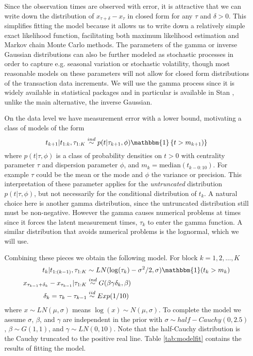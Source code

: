\documentclass{article}
\begin{document}
Since the observation times are observed with error, it is attractive that we can write down the distribution of $x_{\tau + \delta} - x_\tau$ in closed form for any $\tau$ and $\delta>0$. This simplifies fitting the model because it allows us to write down a relatively simple exact likelihood function, facilitating both maximum likelihood estimation and Markov chain Monte Carlo methods. The parameters of the gamma or inverse Gaussian distributions can also be further modeled as stochastic processes in order to capture e.g. seasonal variation or stochastic volatility, though most reasonable models on these parameters will not allow for closed form distributions of the transaction data increments. We will use the gamma process since it is widely available in statistical packages and in particular is available in Stan \citep{stan-software:2015}, unlike the main alternative, the inverse Gaussian.

On the data level we have measurement error with a lower bound, motivating a class of models of the form 
\[
t_{k+1} |t_{1:k}, \tau_{1:K} \stackrel{ind}{\sim} p(t|\tau_{k+1}, \phi)\mathbbm{1}\left\{t > m_{k+1})\right\}
\]
where $p(t|\tau,\phi)$ is a class of probability densities on $t>0$ with centrality parameter $\tau$ and dispersion parameter $\phi$, and $m_k = \mathrm{median}(t_{k - 0:10})$. For example $\tau$ could be the mean or the mode and $\phi$ the variance or precision. This interpretation of these parameter applies for the {\it untruncated} distribution $p(t|\tau,\phi)$, but not necessarily for the conditional distribution of $t_k$. A natural choice here is another gamma distribution, since the untruncated distribution still must be non-negative. However the gamma causes numerical problems at times since it forces the latent measurement times, $\tau_k$ to enter the gamma function. A similar distribution that avoids numerical problems is the lognormal, which we will use.

Combining these pieces we obtain the following model. For block $k=1,2,\dots,K$
\begin{align*}
t_k|t_{1:(k-1)}, \tau_{1:K} &\sim LN(\log(\tau_k) - \sigma^2/2, \sigma)\mathbbm{1}(t_k > m_k)\\
x_{\tau_{k-1} + \delta_k} - x_{\tau_{k-1}}|\tau_{1:K} & \stackrel{ind}{\sim} G(\beta\gamma\delta_k,\beta)\\
\delta_{k} = \tau_{k} - \tau_{k-1} &\stackrel{iid}{\sim} Exp(1/10)
\end{align*}
where $x\sim LN(\mu,\sigma)$ means $\log(x) \sim N(\mu,\sigma)$. To complete the model we assume $\sigma$, $\beta$, and $\gamma$ are independent in the prior with $\sigma \sim \mathit{half-Cauchy}(0, 2.5)$, $\beta \sim G(1, 1)$, and $\gamma \sim LN(0, 10)$. Note that the half-Cauchy distribution is the Cauchy truncated to the positive real line. Table \ref{tab:modelfit} contains the results of fitting the model.
\end{document}
